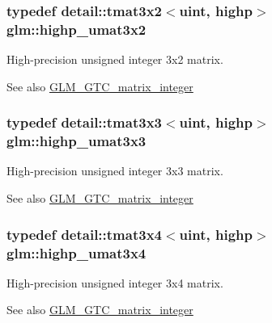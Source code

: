 \subsubsection[{\texorpdfstring{highp\+\_\+umat3x2}{highp_umat3x2}}]{\setlength{\rightskip}{0pt plus 5cm}typedef detail\+::tmat3x2$<$uint, highp$>$ {\bf glm\+::highp\+\_\+umat3x2}}\hypertarget{group__gtc__matrix__integer_ga6f6a73ec605a515fb21d779663082ef9}{}\label{group__gtc__matrix__integer_ga6f6a73ec605a515fb21d779663082ef9}
High-\/precision unsigned integer 3x2 matrix. \begin{DoxySeeAlso}{See also}
\hyperlink{group__gtc__matrix__integer}{G\+L\+M\+\_\+\+G\+T\+C\+\_\+matrix\+\_\+integer} 
\end{DoxySeeAlso}
\subsubsection[{\texorpdfstring{highp\+\_\+umat3x3}{highp_umat3x3}}]{\setlength{\rightskip}{0pt plus 5cm}typedef detail\+::tmat3x3$<$uint, highp$>$ {\bf glm\+::highp\+\_\+umat3x3}}\hypertarget{group__gtc__matrix__integer_ga8dd9f8bfe06de34c8f1a942d2c2e094c}{}\label{group__gtc__matrix__integer_ga8dd9f8bfe06de34c8f1a942d2c2e094c}
High-\/precision unsigned integer 3x3 matrix. \begin{DoxySeeAlso}{See also}
\hyperlink{group__gtc__matrix__integer}{G\+L\+M\+\_\+\+G\+T\+C\+\_\+matrix\+\_\+integer} 
\end{DoxySeeAlso}
\subsubsection[{\texorpdfstring{highp\+\_\+umat3x4}{highp_umat3x4}}]{\setlength{\rightskip}{0pt plus 5cm}typedef detail\+::tmat3x4$<$uint, highp$>$ {\bf glm\+::highp\+\_\+umat3x4}}\hypertarget{group__gtc__matrix__integer_gabaeb2363acd07cc7f99918bae48ccc05}{}\label{group__gtc__matrix__integer_gabaeb2363acd07cc7f99918bae48ccc05}
High-\/precision unsigned integer 3x4 matrix. \begin{DoxySeeAlso}{See also}
\hyperlink{group__gtc__matrix__integer}{G\+L\+M\+\_\+\+G\+T\+C\+\_\+matrix\+\_\+integer} 
\end{DoxySeeAlso}
